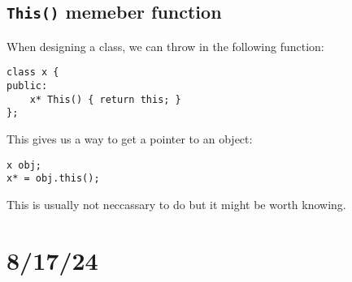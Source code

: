 \documentclass{report}
\begin{document}
\subsection{\texttt{This()} memeber function}
When designing a class, we can throw in the following function:
\begin{verbatim}
class x {
public:
    x* This() { return this; }
};
\end{verbatim}
This gives us a way to get a pointer to an object:
\begin{verbatim}
x obj;
x* = obj.this();
\end{verbatim}
This is usually not neccassary to do but it might be worth knowing.
\section{8/17/24}
\end{document}
